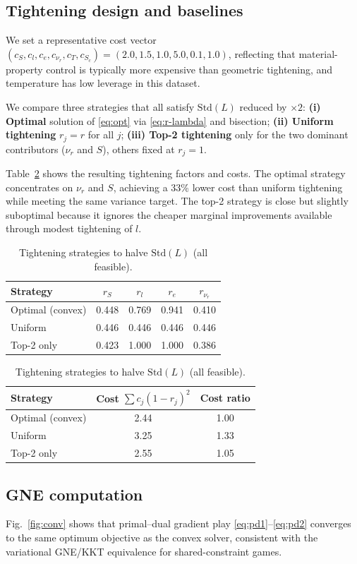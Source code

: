 \documentclass[conference]{IEEEtran}
\begin{document}
\subsection{Tightening design and baselines}
We set a representative cost vector
$(c_S,c_l,c_e,c_{\nu_r},c_T,c_{S_c})=(2.0,1.5,1.0,5.0,0.1,1.0)$,
reflecting that material-property control is typically more expensive than geometric tightening, and temperature has low leverage in this dataset.

We compare three strategies that all satisfy $\mathrm{Std}(L)$ reduced by $\times2$:
\textbf{(i) Optimal} solution of \eqref{eq:opt} via \eqref{eq:r-lambda} and bisection; 
\textbf{(ii) Uniform tightening} $r_j=r$ for all $j$;
\textbf{(iii) Top-2 tightening} only for the two dominant contributors ($\nu_r$ and $S$), others fixed at $r_j=1$.

Table~\ref{tab:tight} shows the resulting tightening factors and costs. The optimal strategy concentrates on $\nu_r$ and $S$, achieving a 33\% lower cost than uniform tightening while meeting the same variance target. The top-2 strategy is close but slightly suboptimal because it ignores the cheaper marginal improvements available through modest tightening of $l$.

\begin{table}[t]
\caption{Tightening strategies to halve $\mathrm{Std}(L)$ (all feasible).}
\label{tab:tight}
\centering
\begin{tabular}{lcccc}
\toprule
Strategy & $r_S$ & $r_l$ & $r_e$ & $r_{\nu_r}$ \\
\midrule
Optimal (convex) & 0.448 & 0.769 & 0.941 & 0.410 \\
Uniform & 0.446 & 0.446 & 0.446 & 0.446 \\
Top-2 only & 0.423 & 1.000 & 1.000 & 0.386 \\
\bottomrule
\end{tabular}

\vspace{1mm}
\begin{tabular}{lcc}
\toprule
Strategy & Cost $\sum c_j(1-r_j)^2$ & Cost ratio \\
\midrule
Optimal (convex) & 2.44 & 1.00 \\
Uniform & 3.25 & 1.33 \\
Top-2 only & 2.55 & 1.05 \\
\bottomrule
\end{tabular}
\end{table}

\subsection{GNE computation}
Fig.~\ref{fig:conv} shows that primal--dual gradient play \eqref{eq:pd1}--\eqref{eq:pd2} converges to the same optimum objective as the convex solver, consistent with the variational GNE/KKT equivalence for shared-constraint games.
\end{document}
